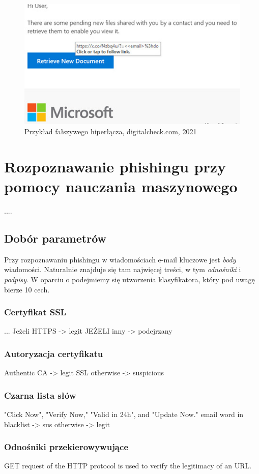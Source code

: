 \documentclass[]{article}
\begin{document}
\begin{figure}[h!]
	\centering
	\includegraphics[width=0.6\linewidth]{Pictures/url_phishing.jpg}
	\caption{Przykład fałszywego hiperłącza, digitalcheck.com, 2021}
	\label{fig:url_phishing}
\end{figure}

\section{Rozpoznawanie phishingu przy pomocy nauczania maszynowego}

....
\subsection{Dobór parametrów}
Przy rozpoznawaniu phishingu w wiadomościach e-mail kluczowe jest \textit{body} wiadomości. Naturalnie znajduje się tam najwięcej treści, w tym \textit{odnośniki} i \textit{podpisy}. W oparciu o podejmiemy się utworzenia klasyfikatora, który pod uwagę bierze 10 cech. 

\subsubsection{Certyfikat SSL}
...
Jeżeli HTTPS -> legit
JEŻELI inny -> podejrzany

\subsubsection{Autoryzacja certyfikatu}
Authentic CA -> legit SSL
otherwise -> suspicious

\subsubsection{Czarna lista słów}
"Click Now", "Verify Now," "Valid in 24h", and "Update Now."
email word in {blacklist} -> sus
otherwise -> legit

\subsubsection{Odnośniki przekierowywujące}
GET request of the HTTP protocol is used to verify the legitimacy of an URL.
\end{document}
